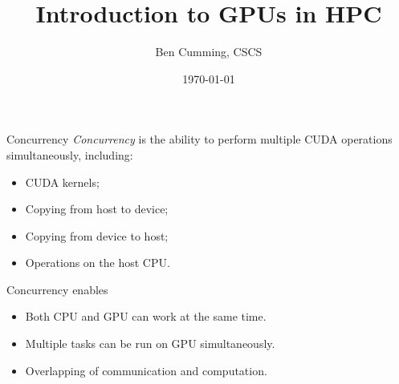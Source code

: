 \documentclass[aspectratio=43]{beamer}
\author{Ben Cumming, CSCS}
\title{Introduction to GPUs in HPC}
\subtitle{}
\date{\today}
\begin{document}
\cscstitle


\begin{frame}[fragile]{Concurrency}
    \emph{Concurrency} is the ability to perform multiple CUDA operations simultaneously, including:
    \begin{itemize}
        \item CUDA kernels;
        \item Copying from host to device;
        \item Copying from device to host;
        \item Operations on the host CPU.
    \end{itemize}

    \begin{info}{Concurrency enables}
        \begin{itemize}
            \item Both CPU and GPU can work at the same time.
            \item Multiple tasks can be run on GPU simultaneously.
            \item Overlapping of communication and computation.
        \end{itemize}
    \end{info}

\end{frame}
\end{document}
